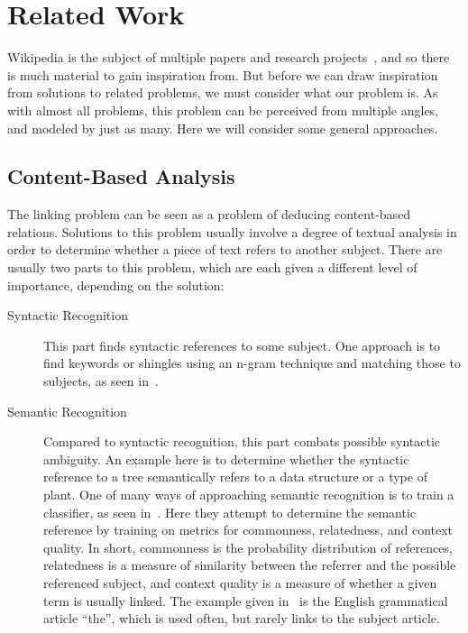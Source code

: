 \chapter{Related Work}\label{sec:related_work}

Wikipedia is the subject of multiple papers and research projects~\cite{wiki-research-newsletter}, and so there is much material to gain inspiration from. But before we can draw inspiration from solutions to related problems, we must consider what our problem is. As with almost all problems, this problem can be perceived from multiple angles, and modeled by just as many. Here we will consider some general approaches.

\section{Content-Based Analysis}\label{related_semantic_contextual}

The linking problem can be seen as a problem of deducing content-based relations. Solutions to this problem usually involve a degree of textual analysis in order to determine whether a piece of text refers to another subject. There are usually two parts to this problem, which are each given a different level of importance, depending on the solution:

\begin{description}
  \item[Syntactic Recognition] This part finds syntactic references to some subject. One approach is to find keywords or shingles using an n-gram technique and matching those to subjects, as seen in~\cite{mihalcea2007wikify}.
  
  \item[Semantic Recognition] Compared to syntactic recognition, this part combats possible syntactic ambiguity. An example here is to determine whether the syntactic reference to a tree semantically refers to a data structure or a type of plant. One of many ways of approaching semantic recognition is to train a classifier, as seen in~\cite{milne2008learning}. Here they attempt to determine the semantic reference by training on metrics for commonness, relatedness, and context quality. In short, commonness is the probability distribution of references, relatedness is a measure of similarity between the referrer and the possible referenced subject, and context quality is a measure of whether a given term is usually linked. The example given in~\cite{milne2008learning} is the English grammatical article \enquote{the}, which is used often, but rarely links to the subject article.
\end{description}



